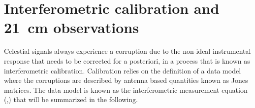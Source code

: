 \section{Interferometric calibration and 21~cm observations}
\label{sec:challenges}

Celestial signals always experience a corruption due to the non-ideal instrumental response that needs to be corrected for a posteriori, in a process that is known as interferometric calibration. Calibration relies on the definition of a data model where the corruptions are described by antenna based quantities known as Jones matrices. The data model is known as the interferometric measurement equation (\cite{hamaker96},\cite{smirnov11}) that will be summarized in the following.

